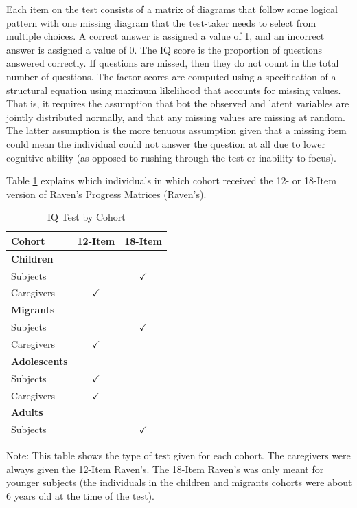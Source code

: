 Each item on the test consists of a matrix of diagrams that follow some logical pattern with one missing diagram that the test-taker needs to select from multiple choices. A correct answer is assigned a value of 1, and an incorrect answer is assigned a value of 0. The IQ score is the proportion of questions answered correctly. If questions are missed, then they do not count in the total number of questions. The factor scores are computed using a specification of a structural equation using maximum likelihood that accounts for missing values. That is, it requires the assumption that bot the observed and latent variables are jointly distributed normally, and that any missing values are missing at random. The latter assumption is the more tenuous assumption given that a missing item could mean the individual could not answer the question at all due to lower cognitive ability (as opposed to rushing through the test or inability to focus).

 Table \ref{tab:test-type} explains which individuals in which cohort received the 12- or 18-Item version of Raven's Progress Matrices (Raven's).

\begin{table}[H]
\begin{center}
	\caption{IQ Test by Cohort}\label{tab:test-type}
	\begin{tabular}{lcc}
		\toprule
		Cohort & 12-Item & 18-Item \\
		\midrule
		\textbf{Children} & &\\
		\quad Subjects & & $\checkmark$  \\
		\quad Caregivers &  $\checkmark$ & \\
		\textbf{Migrants} & & \\
		\quad Subjects & & $\checkmark$ \\
		\quad Caregivers & $\checkmark$ &  \\
		\textbf{Adolescents} & & \\
		\quad Subjects & $\checkmark$ & \\
		\quad Caregivers &  $\checkmark$ &  \\
		\textbf{Adults} & & \\
		\quad Subjects & & $\checkmark$ \\
		\bottomrule
	\end{tabular}
\end{center}
\raggedright \footnotesize Note: This table shows the type of test given for each cohort. The caregivers were always given the 12-Item Raven's. The 18-Item Raven's was only meant for younger subjects (the individuals in the children and migrants cohorts were about 6 years old at the time of the test).
\end{table}

